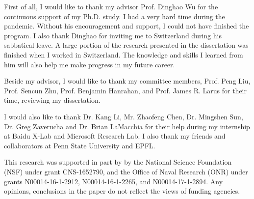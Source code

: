 First of all, I would like to thank my advisor Prof. Dinghao Wu for the continuous support of my Ph.D. study. I had a very hard time during the pandemic. Without his encouragement and support, I could not have finished the program. I also thank Dinghao for inviting me to Switzerland during his sabbatical leave. A large portion of the research presented in the dissertation was finished when I worked in Switzerland. The knowledge and skills I learned from him will also help me make progress in my future career.

Beside my advisor, I would like to thank my committee members, Prof. Peng Liu, Prof. Sencun Zhu, Prof. Benjamin Hanrahan, and Prof. James R. Larus for their time, reviewing my dissertation.

I would also like to thank Dr. Kang Li, Mr. Zhaofeng Chen, Dr. Mingshen Sun, Dr. Greg Zaverucha and Dr. Brian LaMacchia for their help during my internship at Baidu X-Lab and Microsoft Research Lab.  I also thank my friends and collaborators at Penn State University and EPFL. 

This research was supported in part by by the National Science Foundation (NSF) under grant CNS-1652790, and the Office of Naval Research (ONR) under grants N00014-16-1-2912, N00014-16-1-2265, and N00014-17-1-2894. Any opinions, conclusions in the paper do not reflect the views of funding agencies.

